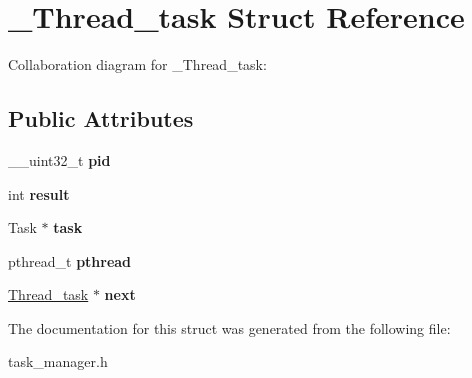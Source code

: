 \hypertarget{struct__Thread__task}{}\section{\+\_\+\+Thread\+\_\+task Struct Reference}
\label{struct__Thread__task}


Collaboration diagram for \+\_\+\+Thread\+\_\+task\+:
\subsection*{Public Attributes}
\begin{DoxyCompactItemize}
\item 
\+\_\+\+\_\+uint32\+\_\+t {\bfseries pid}\hypertarget{struct__Thread__task_aa3b122acb7d4132a0d405924ff12cd8f}{}\label{struct__Thread__task_aa3b122acb7d4132a0d405924ff12cd8f}

\item 
int {\bfseries result}\hypertarget{struct__Thread__task_a1ce2fdb98c09593824e18fffbc0fabba}{}\label{struct__Thread__task_a1ce2fdb98c09593824e18fffbc0fabba}

\item 
Task $\ast$ {\bfseries task}\hypertarget{struct__Thread__task_aef23f55679eb5128661e9a2608863b25}{}\label{struct__Thread__task_aef23f55679eb5128661e9a2608863b25}

\item 
pthread\+\_\+t {\bfseries pthread}\hypertarget{struct__Thread__task_a4c8f959f0d40cba1ba9ed9be0949b163}{}\label{struct__Thread__task_a4c8f959f0d40cba1ba9ed9be0949b163}

\item 
\hyperlink{struct__Thread__task}{Thread\+\_\+task} $\ast$ {\bfseries next}\hypertarget{struct__Thread__task_a28bc02485a2986004624114808804c0b}{}\label{struct__Thread__task_a28bc02485a2986004624114808804c0b}

\end{DoxyCompactItemize}


The documentation for this struct was generated from the following file\+:\begin{DoxyCompactItemize}
\item 
task\+\_\+manager.\+h\end{DoxyCompactItemize}
